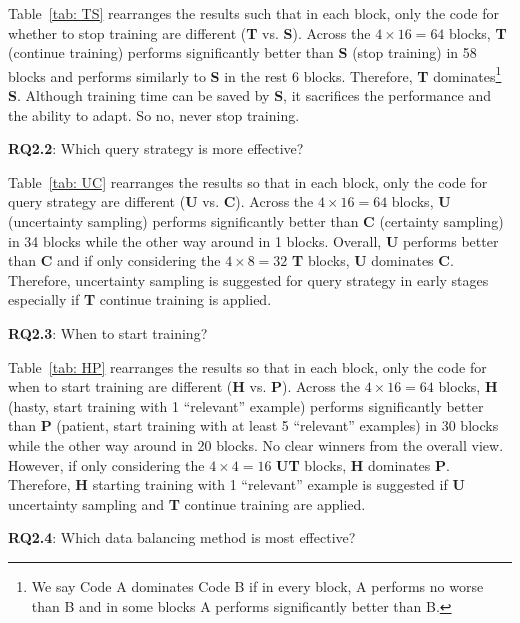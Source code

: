 \documentclass{svjour3}
\theoremstyle{break}
\begin{document}
Table~\ref{tab: TS} rearranges the results such that in each block, only the code for whether to stop training are different (\textbf{T} vs. \textbf{S}). Across the $4\times 16 = 64$ blocks, \textbf{T} (continue training) performs significantly better than \textbf{S} (stop training) in 58 blocks and performs similarly to \textbf{S} in the rest 6 blocks. Therefore, \textbf{T} dominates\footnote{We say Code A dominates Code B if in every block, A performs no worse than B and in some blocks A performs significantly better than B.} \textbf{S}. Although training time can be saved by \textbf{S}, it sacrifices the performance and the ability to adapt. So no, never stop training.

\textbf{RQ2.2}: Which query strategy is more effective?

Table~\ref{tab: UC} rearranges the results so that in each block, only the code for query strategy are different (\textbf{U} vs. \textbf{C}). Across the $4\times 16 = 64$ blocks, \textbf{U} (uncertainty sampling) performs significantly better than \textbf{C} (certainty sampling) in 34 blocks while the other way around in 1 blocks. Overall, \textbf{U} performs better than \textbf{C} and if only considering the $4\times 8 = 32$ \textbf{T} blocks, \textbf{U} dominates \textbf{C}. Therefore, uncertainty sampling is suggested for query strategy in early stages especially if \textbf{T} continue training is applied.

\textbf{RQ2.3}: When to start training?

Table~\ref{tab: HP} rearranges the results so that in each block, only the code for when to start training are different (\textbf{H} vs. \textbf{P}). Across the $4\times 16 = 64$ blocks, \textbf{H} (hasty, start training with 1 ``relevant'' example) performs significantly better than \textbf{P} (patient, start training with at least 5 ``relevant'' examples) in 30 blocks while the other way around in 20 blocks. No clear winners from the overall view. However, if only considering the $4\times 4 = 16$ \textbf{UT} blocks, \textbf{H} dominates \textbf{P}. Therefore, \textbf{H} starting training with 1 ``relevant'' example is suggested if \textbf{U} uncertainty sampling and \textbf{T} continue training are applied.

\textbf{RQ2.4}: Which data balancing method is most effective?
\end{document}
